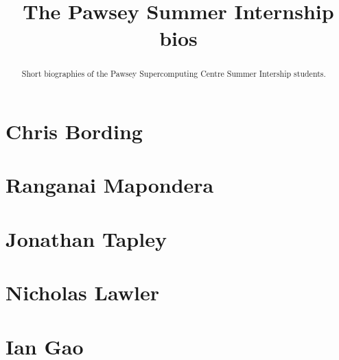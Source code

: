 \documentclass[11pt,a4paper]{report}
\title{The Pawsey Summer Internship bios}
\begin{document}
\maketitle
\tableofcontents


\begin{abstract}

Short biographies of the Pawsey Supercomputing Centre Summer Intership students.

\end{abstract}

\chapter{Chris Bording}


\chapter{Ranganai Mapondera}




\chapter{Jonathan Tapley}


\chapter{Nicholas Lawler}


\chapter{Ian Gao}

\end{document}
